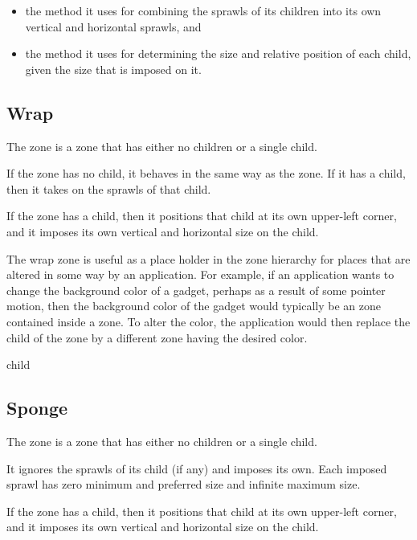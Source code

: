 \begin{itemize}
\item the method it uses for combining the sprawls of its children
  into its own vertical and horizontal sprawls, and
\item the method it uses for determining the size and relative
  position of each child, given the size that is imposed on it. 
\end{itemize}

\subsection{Wrap}
\label{sec-zones-layout-wrap}

The  zone is a zone that has either no children or a single
child.  

If the  zone has no child, it behaves in the same way as
the  zone.  If it has a
child, then it takes on the sprawls of that child.

If the  zone has a child, then it positions that child at
its own upper-left corner, and it imposes its own vertical and
horizontal size on the child.

The wrap zone is useful as a place holder in the zone hierarchy for
places that are altered in some way by an application.  For example,
if an application wants to change the background color of a gadget,
perhaps as a result of some pointer motion, then the background color
of the gadget would typically be an  zone
 contained inside a 
zone.  To alter the color, the application would then replace the
child of the  zone by a different  zone having
the desired color.


 {\optional child}

\subsection{Sponge}
\label{sec-zones-layout-sponge}

The  zone is a zone that has either no children or a
single child.  

It ignores the sprawls of its child (if any) and imposes its own.
Each imposed sprawl has zero minimum and preferred size and infinite
maximum size.

If the  zone has a child, then it positions that child at
its own upper-left corner, and it imposes its own vertical and
horizontal size on the child.

